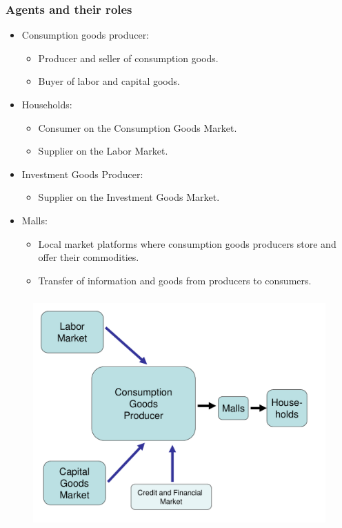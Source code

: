 \documentclass{beamer}
\begin{document}
\frame
{
  \frametitle{Agents and their roles} 
\begin{itemize}
	\item Consumption goods producer:
	
\begin{itemize}
	\item Producer and seller of consumption goods.
	\item Buyer of labor and capital goods. 
\end{itemize}

	\item Households:
	
\begin{itemize}
	\item Consumer on the Consumption Goods Market.
	\item Supplier on the Labor Market.
\end{itemize}

\item Investment Goods Producer:

\begin{itemize}
	\item Supplier on the Investment Goods Market.
\end{itemize}

\item Malls:

\begin{itemize}
	\item Local market platforms where consumption goods producers store and offer their commodities.
	\item Transfer of information and goods from producers to consumers.
\end{itemize}
	
\end{itemize}
	

}



\frame
{
 \frametitle{} 
\begin{figure}
\centering
\includegraphics[scale=0.35]{CGP_Overview.pdf}
\label{fig:CGP_Overview}
\end{figure}


}
\end{document}
